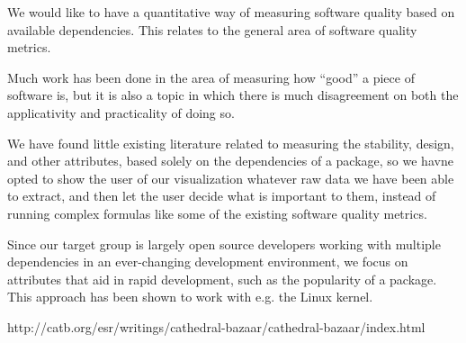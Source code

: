 We would like to have a quantitative way of measuring software quality based on
available dependencies.  This relates to the general area of software quality
metrics.

Much work has been done in the area of measuring how ``good'' a piece of
software is, but it is also a topic in which there is much disagreement on both
the applicativity and practicality of doing so\cite{metrics2004}.

We have found little existing literature related to measuring the stability,
design, and other attributes, based solely on the dependencies of a package, so
we havne opted to show the user of our visualization whatever raw data we have
been able to extract, and then let the user decide what is important to them,
instead of running complex formulas like some of the existing software quality
metrics.

Since our target group is largely open source developers working with multiple
dependencies in an ever-changing development environment, we focus on attributes
that aid in rapid development, such as the popularity of a package.  This
approach has been shown to work with e.g. the Linux
kernel.\cite{cathedral-bazaar}


http://catb.org/esr/writings/cathedral-bazaar/cathedral-bazaar/index.html
